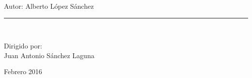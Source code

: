 \begin{titlepage}
\begin{center}
\begin{Large}
		\end{Large}
		\vspace*{0.3in}
		\begin{large}
			Autor: Alberto López Sánchez\\
		\end{large}
		\vspace*{0.2in}
		\rule{80mm}{0.1mm}\\
		\vspace*{0.2in}
		\begin{large}
			Dirigido por: \\
			Juan Antonio Sánchez Laguna\\
		\end{large}
		\vspace*{0.9in}
		Febrero 2016
	\end{center}
	\vspace*{\fill}
\end{titlepage}



\newpage
$\ $
\thispagestyle{empty}

